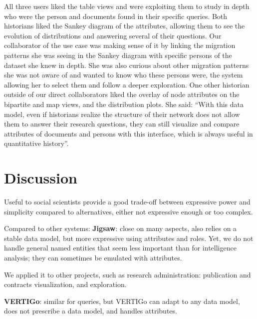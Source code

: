 All three users liked the table views and were exploiting them to study in depth who were the person and documents found in their specific queries.
Both historians liked the Sankey diagram of the attributes, allowing them to see the evolution of distributions and answering several of their questions.
Our collaborator of the use case \nicole was making sense of it by linking the migration patterns she was seeing in the Sankey diagram with specific persons of the dataset she knew in depth.
She was also curious about other migration patterns she was not aware of and wanted to know who these persons were, the system allowing her to select them and follow a deeper exploration.
One other historian outside of our direct collaborators liked the overlay of node attributes on the bipartite and map views, and the distribution plots. She said: ``With this data model, even if historians realize the structure of their network does not allow them to answer their research questions, they can still visualize and compare attributes of documents and persons with this interface, which is always useful in quantitative history''.




\iffalse
\section{Discussion}

Useful to social scientists provide a good trade-off between expressive power and simplicity compared to alternatives, either not expressive enough or too complex.

Compared to other systems:
\textbf{Jigsaw}: close on many aspects, also relies on a stable data model, but more expressive using attributes and roles. Yet, we do not handle general named entities that seem less important than for intelligence analysis; they can sometimes be emulated with attributes.

We applied it to other projects, such as research administration: publication and contracts visualization, and exploration.


\textbf{VERTIGo}: similar for queries, but VERTIGo can adapt to any data model, does not prescribe a data model, and handles attributes.

